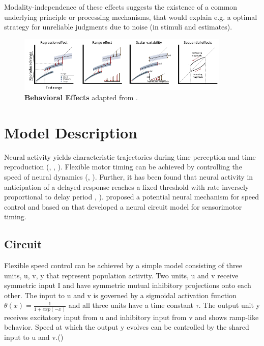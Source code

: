 \documentclass[9pt]{article}
\begin{document}
Modality-independence of these effects suggests the existence of a common underlying principle or processing mechanisms, that would explain e.g. a optimal strategy for unreliable judgments due to noise (in stimuli and estimates).

\begin{figure}[h]
	\centering
	\includegraphics[width=0.9\textwidth]{figures/behavioural_effects_petzschner.pdf}
	\caption{\textbf{Behavioral Effects} adapted from \cite{Petzschner2015}.}
\label{fig:behavioraleffects}
\end{figure}


\section{Model Description}
Neural activity yields characteristic trajectories during time perception and time reproduction (\cite{Meirhaeghe2021}, \cite{Wang2018}, \cite{Henke2021}). 
Flexible motor timing can be achieved by controlling the speed of neural dynamics (\cite{Sohn2019}, \cite{Wang2018}). 
Further, it has been found that neural activity in anticipation of a delayed response reaches a fixed threshold with rate inversely proportional to delay period \cite{Murakami2014}, \cite{Mita2009}).
\cite{Wang2018} proposed a potential neural mechanism for speed control and based on that \cite{Egger2020} developed a neural circuit model for sensorimotor timing.

\subsection{Circuit}
Flexible speed control can be achieved by a simple model consisting of three units, u, v, y that represent population activity. Two units, u and v receive symmetric input I and have symmetric mutual inhibitory projections onto each other. The input to u and v is governed by a sigmoidal activation function $\theta(x) = \frac{1}{1+exp(-x)}$ and all three units have a time constant $\tau$. 
The output unit y receives excitatory input from u and inhibitory input from v and shows ramp-like behavior. 
Speed at which the output y evolves can be controlled by the shared input to u and v.(\cite{Egger2020})
\end{document}
